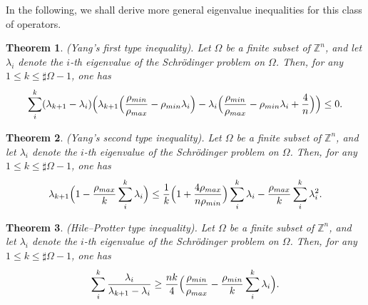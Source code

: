\documentclass[11pt]{article}
\newtheorem{theorem}{Theorem}[section]
\theoremstyle{definition}
\theoremstyle{remark}
\numberwithin{equation}{section}
\begin{document}
In the following, we shall derive more general eigenvalue inequalities for this
class of operators.
\par\noindent
\begin{theorem}\label{thm:1.1} (Yang's first type inequality).
Let $\Omega$ be a finite subset of $\mathbb{Z}^n$, and let $\lambda_i$ denote the $i$-th eigenvalue of the Schrödinger problem on $\Omega$.
Then, for any $1 \le k \le \sharp \Omega - 1$, one has
\begin{align}
  \sum_{i}^{k}(\lambda_{k+1}-\lambda_i)\Bigl(\lambda_{k+1}\Bigl(\frac{\rho_{min}}{\rho_{max}}-{\rho_{min}}\lambda_i\Bigr)-\lambda_i\Bigl(\frac{\rho_{min}}{\rho_{max}}-{\rho_{min}}\lambda_i+\frac{4}{n}\Bigr)\Bigr)\le 0.
  \end{align}
\end{theorem}
\noindent
\begin{theorem}\label{thm:1.2} (Yang's second type inequality).
Let $\Omega$ be a finite subset of $\mathbb{Z}^n$, and let $\lambda_i$ denote the $i$-th eigenvalue of the Schrödinger problem on $\Omega$.
Then, for any $1 \le k \le \sharp \Omega - 1$, one has
\begin{align}
  \lambda_{k+1}\Bigl(1-\frac{\rho_{max}}{k}\sum_{i}^{k}\lambda_i\Bigr)\le \frac{1}{k}\Bigl(1+\frac{4\rho_{max}}{n\rho_{min}}\Bigr)\sum_{i}^{k}\lambda_i-\frac{\rho_{max}}{k}\sum_{i}^{k}\lambda_i^2.
  \end{align}
\end{theorem}
\noindent
\begin{theorem}\label{thm:1.3} (Hile--Protter type inequality).
Let $\Omega$ be a finite subset of $\mathbb{Z}^n$, and let $\lambda_i$ denote the $i$-th eigenvalue of the Schrödinger problem on $\Omega$.
Then, for any $1 \le k \le \sharp \Omega - 1$, one has
\begin{align}
  \sum_{i}^{k}\frac{\lambda_i}{\lambda_{k+1}-\lambda_i}\ge \frac{nk}{4}\Bigl(\frac{\rho_{min}}{\rho_{max}}-\frac{\rho_{min}}{k}\sum_{i}^{k}\lambda_i\Bigr).
  \end{align}
\end{theorem}
\end{document}
